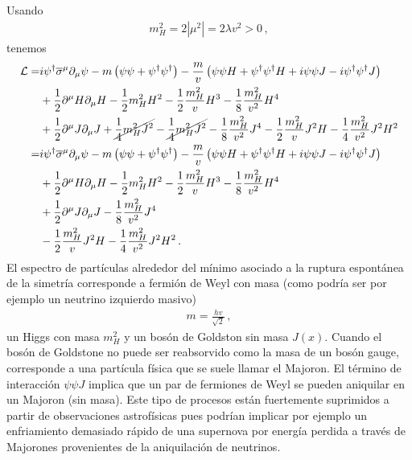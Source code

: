 Usando 
\begin{align*}
  m_H^2=2\left|\mu^2\right|=2\lambda v^2  >0\,,
\end{align*}
tenemos
\begin{align}
   \mathcal{L}=&i\psi^{\dagger}\overline{\sigma}^{\mu}\partial_{\mu}\psi-m \left( \psi\psi +\psi^{\dagger}\psi^{\dagger} \right)-\frac{m}{v} \left( \psi\psi H  +\psi^{\dagger}\psi^{\dagger}H +i\psi\psi J -i\psi^{\dagger}\psi^{\dagger}J \right) \nonumber\\
&+\frac{1}{2}\partial^{\mu} H\partial_{\mu} H-\frac{1}{2}m_H^2H^2-\frac{1}{2}\frac{m_H^2}{v}H^3-\frac{1}{8}\frac{m_H^2}{v^2} H^4 \nonumber\\
&+\frac{1}{2}\partial^{\mu} J\partial_{\mu} J+\cancel{\frac{1}{4} m_H^2 J^2}-\cancel{\frac{1}{4} m_H^2 J^2}- \frac{1}{8}\frac{m_H^2}{v^2} J^4 
-\frac{1}{2}\frac{m_H^2}{v} J^2H -\frac{1}{4}\frac{m_H^2}{v^2} J^2H^2 \nonumber\\
=&i\psi^{\dagger}\overline{\sigma}^{\mu}\partial_{\mu}\psi-m \left( \psi\psi +\psi^{\dagger}\psi^{\dagger} \right)-\frac{m}{v} \left( \psi\psi H  +\psi^{\dagger}\psi^{\dagger}H +i\psi\psi J -i\psi^{\dagger}\psi^{\dagger}J \right) \nonumber\\
&+\frac{1}{2}\partial^{\mu} H\partial_{\mu} H-\frac{1}{2}m_H^2H^2-\frac{1}{2}\frac{m_H^2}{v}H^3-\frac{1}{8}\frac{m_H^2}{v^2} H^4 \nonumber\\
&+\frac{1}{2}\partial^{\mu} J\partial_{\mu} J-\frac{1}{8}\frac{m_H^2}{v^2} J^4 \nonumber\\
&-\frac{1}{2}\frac{m_H^2}{v} J^2H -\frac{1}{4}\frac{m_H^2}{v^2} J^2H^2\,.
\end{align}
El espectro de partículas alrededor del mínimo asociado a la ruptura espontánea de la simetría corresponde a fermión de Weyl con masa (como podría ser por ejemplo un neutrino izquierdo masivo)
\begin{align*}
  m=\frac{hv}{\sqrt{2}}\,,
\end{align*}
un Higgs con masa $m_H^2$ y un bosón de Goldston sin masa $J(x)$. Cuando el bosón de Goldstone no puede ser reabsorvido como la masa de un bosón gauge, corresponde a una partícula física que se suele llamar el Majoron. El término de interacción $\psi \psi J$ implica que un par de fermiones de Weyl se pueden aniquilar en un Majoron (sin masa). Este tipo de procesos están fuertemente suprimidos a partir de observaciones astrofísicas pues podrían implicar por ejemplo un enfriamiento demasiado rápido de una supernova por energía perdida a través de Majorones provenientes de la aniquilación de neutrinos. 


